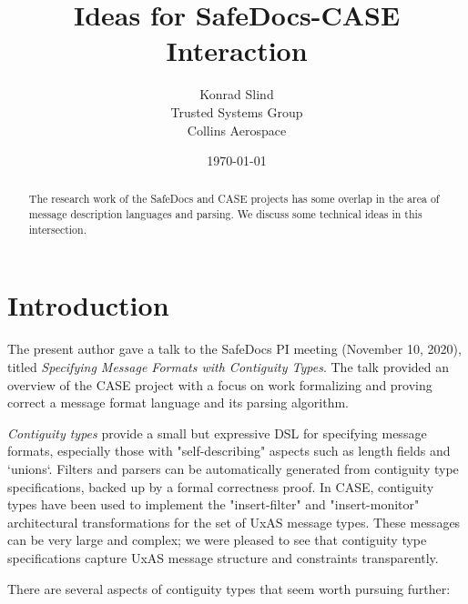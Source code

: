 \documentclass{article}
\begin{document}
\title{Ideas for SafeDocs-CASE Interaction}
\author{Konrad Slind \\ Trusted Systems Group \\ Collins Aerospace}
\date{\today}

\begin{abstract}
The research work of the SafeDocs and CASE projects has some overlap
in the area of message description languages and parsing. We discuss
some technical ideas in this intersection.
\end{abstract}

\maketitle

\section*{Introduction}

The present author gave a talk to the SafeDocs PI meeting (November
10, 2020), titled \emph{Specifying Message Formats with Contiguity
  Types}. The talk provided an overview of the CASE project with a
focus on work formalizing and proving correct a message format
language and its parsing algorithm.

\emph{Contiguity types} provide a small but expressive DSL for
specifying message formats, especially those with "self-describing"
aspects such as length fields and `unions`. Filters and parsers
can be automatically generated from contiguity type specifications,
backed up by a formal correctness proof. In CASE, contiguity types
have been used to implement the "insert-filter" and "insert-monitor"
architectural transformations for the set of UxAS message types. These
messages can be very large and complex; we were pleased to see that
contiguity type specifications capture UxAS message structure and
constraints transparently.

There are several aspects of contiguity types that seem worth pursuing
further:
\end{document}
